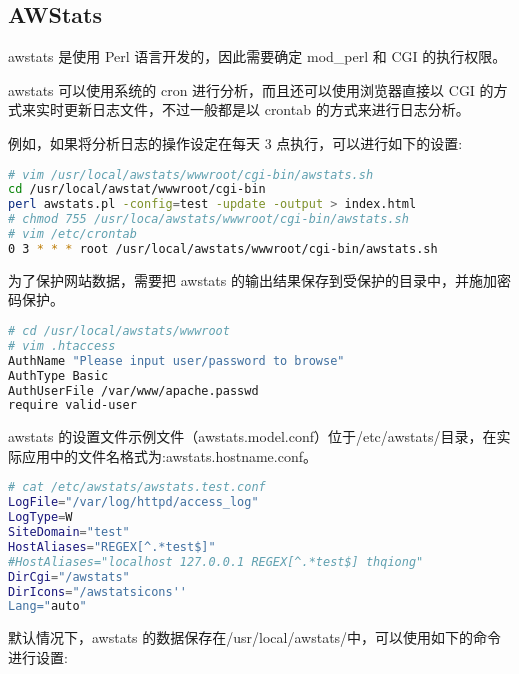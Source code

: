 \subsection{AWStats}

awstats 是使用 Perl 语言开发的，因此需要确定 mod_perl 和 CGI 的执行权限。

awstats 可以使用系统的 cron 进行分析，而且还可以使用浏览器直接以 CGI 的方式来实时更新日志文件，不过一般都是以 crontab 的方式来进行日志分析。

例如，如果将分析日志的操作设定在每天 3 点执行，可以进行如下的设置:


\begin{lstlisting}[language=bash]
# vim /usr/local/awstats/wwwroot/cgi-bin/awstats.sh
cd /usr/local/awstat/wwwroot/cgi-bin
perl awstats.pl -config=test -update -output > index.html
# chmod 755 /usr/loca/awstats/wwwroot/cgi-bin/awstats.sh
# vim /etc/crontab
0 3 * * * root /usr/local/awstats/wwwroot/cgi-bin/awstats.sh
\end{lstlisting}



为了保护网站数据，需要把 awstats 的输出结果保存到受保护的目录中，并施加密码保护。




\begin{lstlisting}[language=bash]
# cd /usr/local/awstats/wwwroot
# vim .htaccess
AuthName "Please input user/password to browse"
AuthType Basic
AuthUserFile /var/www/apache.passwd
require valid-user
\end{lstlisting}

awstats 的设置文件示例文件（awstats.model.conf）位于/etc/awstats/目录，在实际应用中的文件名格式为:awstats.hostname.conf。






\begin{lstlisting}[language=bash]
# cat /etc/awstats/awstats.test.conf
LogFile="/var/log/httpd/access_log"
LogType=W
SiteDomain="test"
HostAliases="REGEX[^.*test$]"
#HostAliases="localhost 127.0.0.1 REGEX[^.*test$] thqiong"
DirCgi="/awstats"
DirIcons="/awstatsicons''
Lang="auto"
\end{lstlisting}


默认情况下，awstats 的数据保存在/usr/local/awstats/中，可以使用如下的命令进行设置:



